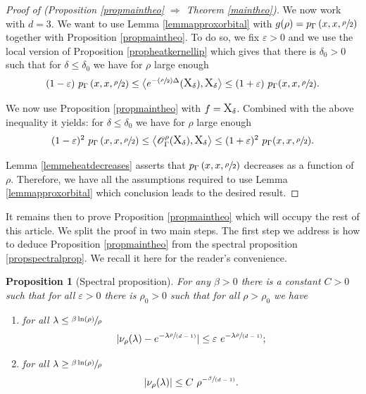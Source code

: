 \documentclass[JEP,XML,SOM,Unicode,NoFloatCountersInSection,published]{cedram}
\let\mathcal\mathscr
\let\epsilon\varepsilon
\newcommand{\Psfrac}[2]{(\sfrac{#1}{#2})}
\newcommand{\spfrac}[2]{\sfrac{#1}{(#2)}}
\theoremstyle{plain}
\newtheorem{proposition}[equation]{Proposition}
\theoremstyle{definition}
\begin{document}
\begin{proof}[Proof of (Proposition \ref{propmaintheo} $\Rightarrow$ Theorem \ref{maintheo})]
We now work with $d =3$. We want to use Lemma \ref{lemmapproxorbital} with $g(\rho) = p_{\Gamma}\left(x,x,\sfrac{\rho}{2}\right)$ together with Proposition \ref{propmaintheo}. To do so, we fix $\epsilon > 0$ and we use the local version of Proposition \ref{propheatkernellip} which gives that there is $\delta_0 >0$ such that for $\delta \le \delta_0$ we have for $\rho$ large enough
\[
(1 - \epsilon) \ p_{\Gamma}\left(x,x,\sfrac{\rho}{2} \right) \le \bigl< e^{- \Psfrac{\rho}{2} \Delta}(\text{\large{X}}_{\delta}), \text{\large{X}}_{\delta} \bigr> \le (1 + \epsilon) \ p_{\Gamma}(x,x,\sfrac{\rho}{2}).
\]

We now use Proposition \ref{propmaintheo} with $f = \text{\large{X}}_{\delta} $. Combined with the above inequality it yields: for $\delta \le \delta_0$ we have for $\rho$ large enough
\[
(1 - \epsilon)^2 \ p_{\Gamma}\left(x,x,\sfrac{\rho}{2} \right) \le \left< \mathcal{O}_{\Gamma}^{\rho}(\text{\large{X}}_{\delta}), \text{\large{X}}_{\delta} \right> \le (1 + \epsilon)^2 \ p_{\Gamma}(x,x,\sfrac{\rho}{2}).
\]

Lemma \ref{lemmeheatdecreases} asserts that $p_{\Gamma}\left(x,x,\sfrac{\rho}{2} \right)$ decreases as a function of $\rho$. Therefore, we have all the assumptions required to use Lemma \ref{lemmapproxorbital} which conclusion leads to the desired result.
\end{proof}

It remains then to prove Proposition \ref{propmaintheo} which will occupy the rest of this article. We split the proof in two main steps. The first step we address is how to deduce Proposition \ref{propmaintheo} from the spectral proposition \ref{propspectralprop}. We recall it here for the reader's convenience.

\begin{proposition}[Spectral proposition]
\label{propapproxvp}
For any $\beta >0$ there is a constant $C > 0$ such that for all $\epsilon > 0$ there is $\rho_0 > 0$ such that for all $\rho > \rho_0$ we have
\begin{enumerate}
\item for all $ \lambda \le \sfrac{\beta \ln (\rho) }{\rho} $
\[
| \nu_{\rho}(\lambda) - e^{-\lambda \spfrac{\rho}{d-1}}| \le \epsilon \ e^{ - \lambda \spfrac{\rho}{d-1}} ;
\]
\item for all $ \lambda \ge \sfrac{\beta \ln (\rho) }{\rho}$
\[
|\nu_{\rho}(\lambda)| \le C \ \rho^{-\spfrac{\beta}{d-1}}.
\]
\end{enumerate}
\end{proposition}
\end{document}
